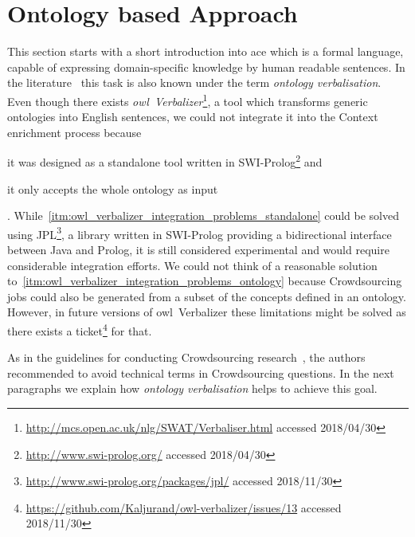
\section{Ontology based Approach}\label{sec:neighboring_nodes}
This section starts with a short introduction into \gls{ace} which is a formal language, capable of expressing domain-specific knowledge by human readable sentences. In the literature~\cite{soton265735} this task is also known under the term \textit{ontology verbalisation}. Even though there exists \textit{\gls{owl}~Verbalizer}\footnote{\url{http://mcs.open.ac.uk/nlg/SWAT/Verbaliser.html} accessed 2018/04/30}, a tool which transforms generic ontologies into English sentences, we could not integrate it into the Context enrichment process because 
\begin{inparaenum}[1)]
		\item \label{itm:owl_verbalizer_integration_problems_standalone} it was designed as a standalone tool written in SWI-Prolog\footnote{\url{http://www.swi-prolog.org/} accessed 2018/04/30} and
		\item \label{itm:owl_verbalizer_integration_problems_ontology} it only accepts the whole ontology as input
\end{inparaenum}. While~\ref{itm:owl_verbalizer_integration_problems_standalone} could be solved using JPL\footnote{\url{http://www.swi-prolog.org/packages/jpl/} accessed 2018/11/30}, a library written in SWI-Prolog providing a bidirectional interface between Java and Prolog, it is still considered experimental and would require considerable integration efforts. We could not think of a reasonable solution to~\ref{itm:owl_verbalizer_integration_problems_ontology} because Crowdsourcing jobs could also be generated from a subset of the concepts defined in an ontology. However, in future versions of \gls{owl}~Verbalizer these limitations might be solved as there exists a ticket\footnote{\url{https://github.com/Kaljurand/owl-verbalizer/issues/13} accessed 2018/11/30} for that. 

As in the guidelines for conducting Crowdsourcing research~\cite{sarasua2015crowdsourcing}, the authors recommended to avoid technical terms in Crowdsourcing questions. In the next paragraphs we explain how \textit{ontology verbalisation} helps to achieve this goal. 

